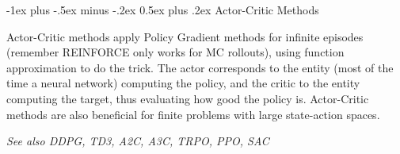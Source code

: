 \documentclass[10pt,landscape]{article}
\makeatletter
\renewcommand{\section}{\@startsection{section}{1}{0mm}%
                                {-1ex plus -.5ex minus -.2ex}%
                                {0.5ex plus .2ex}%
                                {\normalfont\large\bfseries}}
\makeatother
\begin{document}
\begin{multicols}{3}


\section{Actor-Critic Methods}

Actor-Critic methods apply Policy Gradient methods for infinite episodes (remember REINFORCE only works for MC rollouts), using function approximation to do the trick. The actor corresponds to the entity (most of the time a neural network) computing the policy, and the critic to the entity computing the target, thus evaluating how good the policy is. Actor-Critic methods are also beneficial for finite problems with large state-action spaces.

\tiny \textit{See also DDPG, TD3, A2C, A3C, TRPO, PPO, SAC}
\end{multicols}













\newpage
\end{document}
